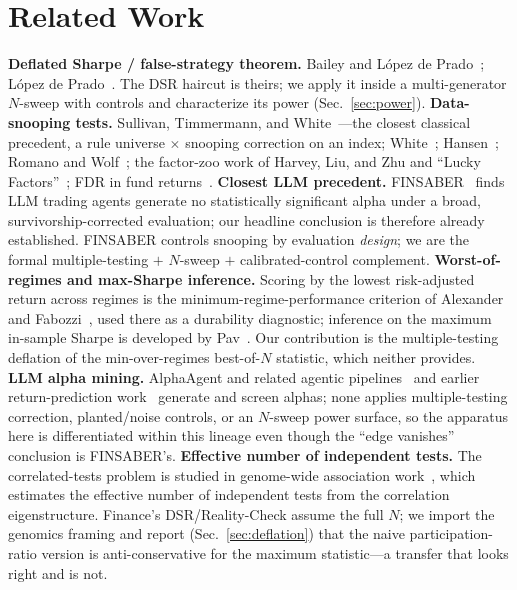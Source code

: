 \documentclass[sigconf]{acmart}
\begin{document}
\section{Related Work}
\textbf{Deflated Sharpe / false-strategy theorem.} Bailey and L\'opez de Prado~\cite{bailey2014dsr,bailey2016pbo}; L\'opez de Prado~\cite{lopezdeprado2018}. The DSR haircut is theirs; we apply it inside a multi-generator $N$-sweep with controls and characterize its power (Sec.~\ref{sec:power}).
\textbf{Data-snooping tests.} Sullivan, Timmermann, and White~\cite{stw1999}---the closest classical precedent, a rule universe $\times$ snooping correction on an index; White~\cite{white2000}; Hansen~\cite{hansen2005}; Romano and Wolf~\cite{romanowolf2005}; the factor-zoo work of Harvey, Liu, and Zhu and ``Lucky Factors''~\cite{harvey2016,harveyliu2021}; FDR in fund returns~\cite{barras2010}.
\textbf{Closest LLM precedent.} FINSABER~\cite{finsaber2026} finds LLM trading agents generate no statistically significant alpha under a broad, survivorship-corrected evaluation; our headline conclusion is therefore already established. FINSABER controls snooping by evaluation \emph{design}; we are the formal multiple-testing $+$ $N$-sweep $+$ calibrated-control complement.
\textbf{Worst-of-regimes and max-Sharpe inference.} Scoring by the lowest risk-adjusted return across regimes is the minimum-regime-performance criterion of Alexander and Fabozzi~\cite{alexander2026mrp}, used there as a durability diagnostic; inference on the maximum in-sample Sharpe is developed by Pav~\cite{pav2019}. Our contribution is the multiple-testing deflation of the min-over-regimes best-of-$N$ statistic, which neither provides.
\textbf{LLM alpha mining.} AlphaAgent and related agentic pipelines~\cite{alphaagent2025} and earlier return-prediction work~\cite{lopezlira2023} generate and screen alphas; none applies multiple-testing correction, planted/noise controls, or an $N$-sweep power surface, so the apparatus here is differentiated within this lineage even though the ``edge vanishes'' conclusion is FINSABER's.
\textbf{Effective number of independent tests.} The correlated-tests problem is studied in genome-wide association work~\cite{nyholt2004,galwey2009}, which estimates the effective number of independent tests from the correlation eigenstructure. Finance's DSR/Reality-Check assume the full $N$; we import the genomics framing and report (Sec.~\ref{sec:deflation}) that the naive participation-ratio version is anti-conservative for the maximum statistic---a transfer that looks right and is not.
\end{document}
